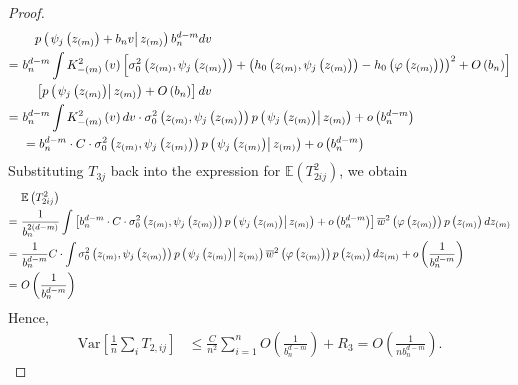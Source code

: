 \documentclass[12pt,american]{article}
\theoremstyle{definition}
\theoremstyle{plain}
\theoremstyle{definition}
\theoremstyle{plain}
\theoremstyle{plain}
\theoremstyle{plain}
\theoremstyle{plain}
\theoremstyle{plain}
\newcommand{\E}{\mathbb{E}}
\begin{document}
\begin{proof}
\begin{align*}
&\quad p\left(\left.\psi_{j}\left(z_{\left(m\right)}\right)+b_{n}v\right|z_{\left(m\right)}\right)b_{n}^{d-m}dv\\
 =\ & b_{n}^{d-m}\int K_{-\left(m\right)}^{2}\left(v\right)\left[\sigma_{0}^{2}\left(z_{\left(m\right)},\psi_{j}\left(z_{\left(m\right)}\right)\right)+\left(h_{0}\left(z_{\left(m\right)},\psi_{j}\left(z_{\left(m\right)}\right)\right)-h_{0}\left(\varphi\left(z_{\left(m\right)}\right)\right)\right)^{2}+O\left(b_{n}\right)\right]\\
 &\quad \left[p\left(\left.\psi_{j}\left(z_{\left(m\right)}\right)\right|z_{\left(m\right)}\right)+O\left(b_{n}\right)\right]dv\\
 =\ & b_{n}^{d-m}\int K_{-\left(m\right)}^{2}\left(v\right)dv\cdot\sigma_{0}^{2}\left(z_{\left(m\right)},\psi_{j}\left(z_{\left(m\right)}\right)\right)p\left(\left.\psi_{j}\left(z_{\left(m\right)}\right)\right|z_{\left(m\right)}\right)+o\left(b_{n}^{d-m}\right)\\
 & =b_{n}^{d-m}\cdot C\cdot\sigma_{0}^{2}\left(z_{\left(m\right)},\psi_{j}\left(z_{\left(m\right)}\right)\right)p\left(\left.\psi_{j}\left(z_{\left(m\right)}\right)\right|z_{\left(m\right)}\right)+o\left(b_{n}^{d-m}\right)
\end{align*}
Substituting $T_{3j}$ back into the expression for $\E(T_{2ij}^2)$, we obtain
\begin{align*}
&\E\left(T_{2ij}^{2}\right) \\
=\ & \frac{1}{b_{n}^{2\left(d-m\right)}}\int\left[b_{n}^{d-m}\cd C\cd\s_{0}^{2}\left(z_{\left(m\right)},\psi_{j}\left(z_{\left(m\right)}\right)\right)p\left(\rest{\psi_{j}\left(z_{\left(m\right)}\right)}z_{\left(m\right)}\right)+o\left(b_{n}^{d-m}\right)\right]\ol w^{2}\left(\varphi\left(z_{\left(m\right)}\right)\right)p\left(z_{\left(m\right)}\right)dz_{\left(m\right)}\\
 =\ & \frac{1}{b_{n}^{d-m}}C\cd\int\s_{0}^{2}\left(z_{\left(m\right)},\psi_{j}\left(z_{\left(m\right)}\right)\right)p\left(\rest{\psi_{j}\left(z_{\left(m\right)}\right)}z_{\left(m\right)}\right) \ol w^{2}\left(\varphi\left(z_{\left(m\right)}\right)\right)p\left(z_{\left(m\right)}\right)dz_{\left(m\right)}+o\left(\frac{1}{b_{n}^{d-m}}\right)\\
 =\ & O\left(\frac{1}{b_{n}^{d-m}}\right)
\end{align*}
Hence,
\begin{align*}
\text{Var}\left[\frac{1}{n}\sum_{i}T_{2,ij}\right]  & \leq\frac{C{}}{n^2}\sum_{i=1}^{n}O\left(\frac{1}{b_{n}^{d-m}}\right)+R_{3}=O\left(\frac{1}{nb_{n}^{d-m}}\right).
\end{align*}
\end{proof}
\end{document}
